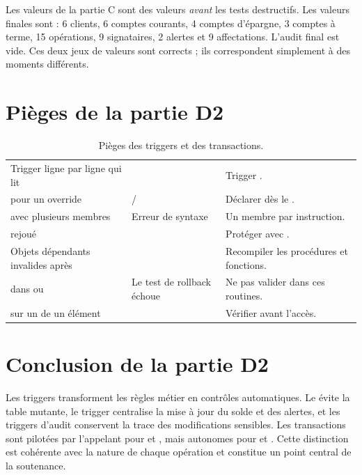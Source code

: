 \begin{attentionbox}
Les valeurs de la partie C sont des valeurs \emph{avant} les tests destructifs.
Les valeurs finales sont : 6 clients, 6 comptes courants, 4 comptes d'épargne,
3 comptes à terme, 15 opérations, 9 signataires, 2 alertes et 9 affectations.
L'audit final est vide. Ces deux jeux de valeurs sont corrects ; ils
correspondent simplement à des moments différents.
\end{attentionbox}

\section{Pièges de la partie D2}

\begin{table}[htbp]
  \centering
  \small
  \caption{Pièges des triggers et des transactions.}
  \label{tab:pieges-D2}
  \begin{tabularx}{\textwidth}{@{}L{5.0cm}L{4.6cm}X@{}}
    \toprule
     &  &  \\
    \midrule
    Trigger ligne par ligne qui lit  &  &
    Trigger . \\
     pour un override &
     /  &
    Déclarer  dès le . \\
     avec plusieurs membres & Erreur de syntaxe &
    Un membre par instruction. \\
     rejoué &  &
    Protéger avec . \\
    Objets dépendants invalides après  &
     & Recompiler les procédures et fonctions. \\
     dans  ou  &
    Le test de rollback échoue & Ne pas valider dans ces routines. \\
     sur un  de un élément &
     & Vérifier  avant l'accès. \\
    \bottomrule
  \end{tabularx}
\end{table}

\section{Conclusion de la partie D2}

Les triggers transforment les règles métier en contrôles automatiques. Le
 évite la table mutante, le trigger  centralise la
mise à jour du solde et des alertes, et les triggers d'audit conservent la
trace des modifications sensibles. Les transactions sont pilotées par
l'appelant pour  et , mais autonomes pour
 et . Cette distinction est cohérente avec
la nature de chaque opération et constitue un point central de la soutenance.
